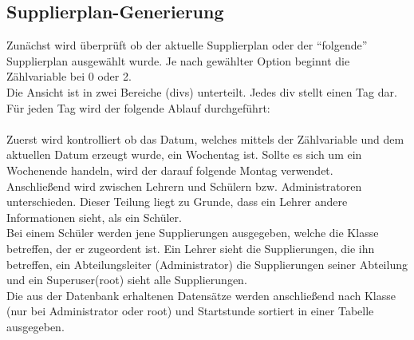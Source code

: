 \subsection{Supplierplan-Generierung}

Zunächst wird überprüft ob der aktuelle Supplierplan oder der \enquote{folgende} Supplierplan ausgewählt wurde. Je nach gewählter Option beginnt die Zählvariable bei 0 oder 2.\\
Die Ansicht ist in zwei Bereiche (divs) unterteilt. Jedes div stellt einen Tag dar.\\
Für jeden Tag wird der folgende Ablauf durchgeführt:\\\\
Zuerst wird kontrolliert ob das Datum, welches mittels der Zählvariable und dem aktuellen Datum erzeugt wurde, ein Wochentag ist. Sollte es sich um ein Wochenende handeln, wird der darauf folgende Montag verwendet.\\
Anschließend wird zwischen Lehrern und Schülern bzw. Administratoren unterschieden. Dieser Teilung liegt zu Grunde, dass ein Lehrer andere Informationen sieht, als ein Schüler.
\\
Bei einem Schüler werden jene Supplierungen ausgegeben, welche die Klasse betreffen, der er zugeordent ist. Ein Lehrer sieht die Supplierungen, die ihn betreffen, ein Abteilungsleiter (Administrator) die Supplierungen seiner Abteilung und ein Superuser(root) sieht alle Supplierungen.\\
Die aus der Datenbank erhaltenen Datensätze werden anschließend nach Klasse (nur bei Administrator oder root) und Startstunde sortiert in einer Tabelle ausgegeben.